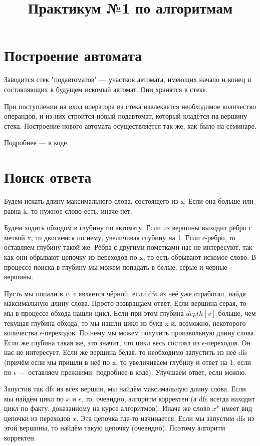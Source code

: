 \documentclass[a4paper,10pt, russian]{article}
\title{Практикум №1 по алгоритмам}
\begin{document}
	\maketitle
	
	\section{Построение автомата}
	
	Заводится стек "подавтоматов" --- участков автомата, имеющих начало и конец и составляющих в будущем искомый автомат. Они хранятся в стеке.
	
	При поступлении на вход оператора из стека извлекается необходимое количество операндов, и из них строится новый подавтомат, который кладётся на вершину стека. Построение нового автомата осуществляется так же, как было на семинаре. 
	
	Подробнее --- в коде.
	
	\section{Поиск ответа}
	Будем искать длину максимального слова, состоящего из x. Если она больше или равна k, то нужное слово есть, иначе нет.
	
	Будем ходить обходом в глубину по автомату. Если из вершины выходит ребро с меткой x, то двигаемся по нему, увеличивая глубину на 1. Если $\epsilon$-ребро, то оставляем глубину такой же. Рёбра с другими пометками нас не интересуют, так как они обрывают цепочку из переходов по x, то есть обрывают искомое слово. В процессе поиска в глубину мы можем попадать в белые, серые и чёрные вершины. 
	
	Пусть мы попали в $v$. $v$ является чёрной, если dfs из неё уже отработал, найдя максимальную длину слова. Просто возвращаем ответ. Если вершина серая, то мы в процессе обхода нашли цикл. Если при этом глубина $depth[v]$ больше, чем текущая глубина обхода, то мы нашли цикл из букв x и, возможно, некоторого количества $\epsilon$-переходов. По нему мы можем получить произвольную длину слова. Если же глубина такая же, это значит, что цикл весь состоял из $\epsilon$-переходов. Он нас не интересует. Если же вершина белая, то
	необходимо запустить из неё dfs (причём если мы пришли в неё по x, то увеличиваем глубину и ответ на 1, если по $\epsilon$ --- оставляем прежними; подробнее в коде). Улучшаем ответ, если можно.
	
	Запустив так dfs из всех вершин, мы найдём максимальную длину слова.
	Если мы найдём цикл по $x$ и $\epsilon$, то, очевидно, алгоритм корректен (а dfs всегда находит цикл по факту, доказанному на курсе алгоритмов). Иначе же слово $x^k$ имеет вид цепочки из переходов $x$. Эта цепочка где-то начинается. Если мы запустим dfs из этой вершины, то найдём такую цепочку (очевидно). Поэтому алгоритм корректен.
	
\end{document}
